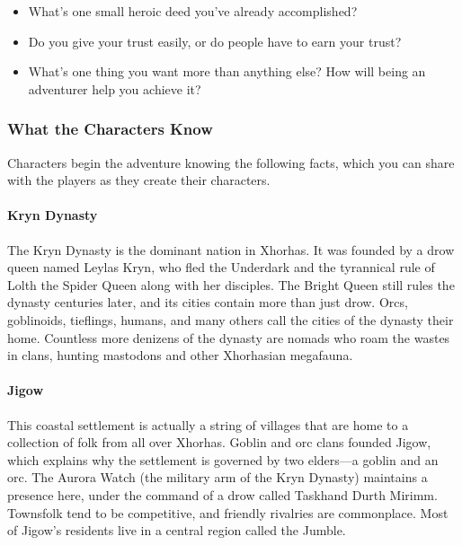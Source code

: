 \documentclass[10pt,a4paper,twoside,bg=print,twocolumn,openany,nodeprecatedcode]{dndbook}
\begin{document}
\begin{itemize}
\item What's one small heroic deed you've already accomplished?
\item Do you give your trust easily, or do people have to earn your trust?
\item What's one thing you want more than anything else? How will being an adventurer help you achieve it?
\end{itemize}

\subsubsection{What the Characters Know}
Characters begin the adventure knowing the following facts, which you can share with the players as they create their characters.
\paragraph{Kryn Dynasty}
The Kryn Dynasty is the dominant nation in Xhorhas. It was founded by a drow queen named Leylas Kryn, who fled the Underdark and the tyrannical rule of Lolth the Spider Queen along with her disciples. The Bright Queen still rules the dynasty centuries later, and its cities contain more than just drow. Orcs, goblinoids, tieflings, humans, and many others call the cities of the dynasty their home. Countless more denizens of the dynasty are nomads who roam the wastes in clans, hunting mastodons and other Xhorhasian megafauna.
\paragraph{Jigow}
This coastal settlement is actually a string of villages that are home to a collection of folk from all over Xhorhas. Goblin and orc clans founded Jigow, which explains why the settlement is governed by two elders—a goblin and an orc. The Aurora Watch (the military arm of the Kryn Dynasty) maintains a presence here, under the command of a drow called Taskhand Durth Mirimm.
Townsfolk tend to be competitive, and friendly rivalries are commonplace. Most of Jigow's residents live in a central region called the Jumble.
\end{document}

